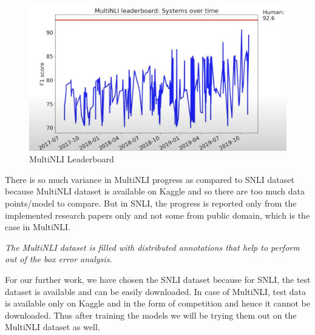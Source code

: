\begin{figure}[h]
	\includegraphics[scale=0.5]{img/multinli.png}
	\caption{MultiNLI Leaderboard \cite{ytvid}}
\end{figure}


There is so much variance in MultiNLI progress as compared to SNLI dataset because MultiNLI dataset is available on Kaggle and so there are too much data points/model to compare. But in SNLI, the progress is reported only from the implemented research papers only and not some from public domain, which is the case in MultiNLI.

\textit{The MultiNLI dataset is filled with distributed annotations that help to perform out of the box error analysis.}


For our further work, we have chosen the SNLI dataset because for SNLI, the test dataset is available and can be easily downloaded. In case of MultiNLI, test data is available only on Kaggle and in the form of competition and hence it cannot be downloaded. Thus after training the models we will be trying them out on the MultiNLI dataset as well.

